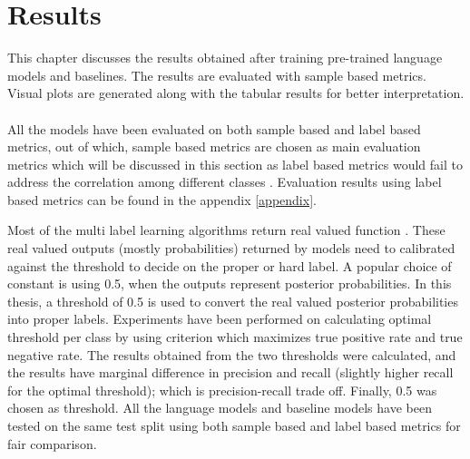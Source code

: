 \chapter{Results}

This chapter discusses the results obtained after training pre-trained language models and baselines. The results are evaluated with sample based metrics. Visual plots are generated along with the tabular results for better interpretation. 
\\
\\
All the models have been evaluated on both sample based and label based metrics, out of which, sample based metrics are chosen as main evaluation metrics which will be discussed in this section as label based metrics would fail to address the correlation among different classes \cite{zhang2010multi}. Evaluation results using label based metrics can be found in the appendix \ref{appendix}.

Most of the multi label learning algorithms return real valued function \cite{zhang2010multi}. These real valued outputs (mostly probabilities) returned by models need to calibrated against the threshold to decide on the proper or hard label. A popular choice of constant is using 0.5, when the outputs represent posterior probabilities\cite{zhang2010multi}. In this thesis, a threshold of 0.5 is used to convert the real valued posterior probabilities into proper labels. Experiments have been performed on calculating optimal threshold per class by using criterion which maximizes true positive rate and true negative rate. The results obtained from the two thresholds were calculated, and the results have marginal difference  in precision and recall (slightly higher recall for the optimal threshold); which is precision-recall trade off. Finally, 0.5 was chosen as threshold. All the language models and baseline models have been tested on the same test split using both sample based and label based metrics for fair comparison. 

